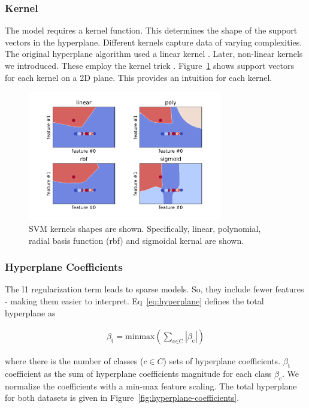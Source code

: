 \documentclass{article}
\begin{document}
\subsubsection{Kernel}
\label{sec:background-svm-kernel}

The model requires a kernel function.
This determines the shape of the support vectors in the hyperplane.
Different kernels capture data of varying complexities.
The original hyperplane algorithm used a linear kernel \cite{aizerman1964theoretical}.
Later, non-linear kernels we introduced.
These employ the kernel trick \cite{boser1992training}.
Figure~\ref{fig:kernels} shows support vectors for each kernel on a 2D plane.
This provides an intuition for each kernel.

\begin{figure}[htb]
  \centering
  \includegraphics[width=8.5cm]{kernels.png}
  \caption{
    SVM kernels shapes are shown.
    Specifically, linear, polynomial, radial basis function (rbf) and sigmoidal kernal are shown.}
  \label{fig:kernels}
\end{figure}

\subsubsection{Hyperplane Coefficients}
\label{sec:background-svm-hyperplane}

The l1 regularization term leads to sparse models.
So, they include fewer features - making them easier to interpret.
Eq~\ref{eq:hyperplane} defines the total hyperplane as

\begin{align}\label{eq:hyperplane}
  \beta_{\text{t}} = \text{minmax}(
  \sum_{\text{c} \in \text{C}}
  |\beta_{\text{c}}|
  )
\end{align}

where there is the number of classes ($c \in C$) sets of hyperplane coefficients.
$\beta_{\text{t}}$ coefficient as the sum of hyperplane coefficients magnitude for each class $\beta_{\text{c}}$.
We normalize the coefficients with a min-max feature scaling.
The total hyperplane for both datasets is given in Figure~\ref{fig:hyperplane-coefficients}.
\end{document}
